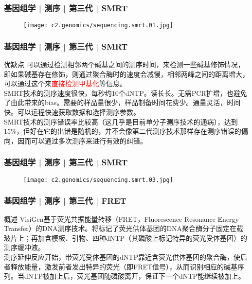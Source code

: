 \begin{frame}
  \frametitle{基因组学 | 测序 | 第三代 | SMRT}
  \begin{figure}
    \centering
    \texttt{[image: c2.genomics/sequencing.smrt.01.jpg]}
  \end{figure}
\end{frame}

\begin{frame}
  \frametitle{基因组学 | 测序 | 第三代 | SMRT}
  \begin{block}{优缺点}
可以通过检测相邻两个碱基之间的测序时间，来检测一些碱基修饰情况，即如果碱基存在修饰，则通过聚合酶时的速度会减慢，相邻两峰之间的距离增大，可以通过这个来\textcolor{red}{直接检测甲基化}等信息。\\
\vspace{1em}
SMRT技术的测序速度很快，每秒约10个dNTP。读长长。无需PCR扩增，也避免了由此带来的bias。需要的样品量很少，样品制备时间花费少。通量灵活，时间快。可以远程快速获取数据和选择测序参数。\\
\vspace{1em}
SMRT技术的测序错误率比较高（这几乎是目前单分子测序技术的通病），达到15\%，但好在它的出错是随机的，并不会像第二代测序技术那样存在测序错误的偏向，因而可以通过多次测序来进行有效的纠错。
  \end{block}
\end{frame}

\begin{frame}
  \frametitle{基因组学 | 测序 | 第三代 | SMRT}
  \begin{figure}
    \centering
    \texttt{[image: c2.genomics/sequencing.smrt.03.jpg]}
  \end{figure}
\end{frame}

\begin{frame}
  \frametitle{基因组学 | 测序 | 第三代 | FRET}
  \begin{block}{概述}
VisiGen基于荧光共振能量转移（FRET，Fluorescence Resonance Energy Transfer）的DNA测序技术。将标记了荧光供体基团的DNA聚合酶分子固定在载玻片上；再加含模板、引物、四种dNTP（其磷酸上标记特异的荧光受体基团）的测序缓冲液。\\
\vspace{1em}
测序延伸反应开始，带荧光受体基团的dNTP靠近含荧光供体基团的聚合酶，使后者释放能量，激发前者发出特异的荧光（即FRET信号），从而识别相应的碱基序列。当dNTP被加上后，荧光基团随磷酸离开，保证下一个dNTP能继续被加上。
  \end{block}
\end{frame}

